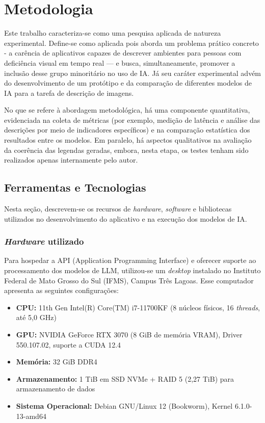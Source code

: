 \chapter{Metodologia}  \label{cap:03}

Este trabalho caracteriza-se como uma pesquisa aplicada de natureza experimental. Define-se como aplicada pois aborda um problema prático concreto - a carência de aplicativos capazes de descrever ambientes para pessoas com deficiência visual em tempo real — e busca, simultaneamente, promover a inclusão desse grupo minoritário no uso de IA. Já seu caráter experimental advém do desenvolvimento de um protótipo e da comparação de diferentes modelos de IA para a tarefa de descrição de imagens.

No que se refere à abordagem metodológica, há uma componente quantitativa, evidenciada na coleta de métricas (por exemplo, medição de latência e análise das descrições por meio de indicadores específicos) e na comparação estatística dos resultados entre os modelos. Em paralelo, há aspectos qualitativos na avaliação da coerência das legendas geradas, embora, nesta etapa, os testes tenham sido realizados apenas internamente pelo autor.

\section{Ferramentas e Tecnologias}

Nesta seção, descrevem-se os recursos de \textit{hardware}, \textit{software} e bibliotecas utilizados no desenvolvimento do aplicativo e na execução dos modelos de IA.

\subsection{\textit{Hardware} utilizado}

Para hospedar a API (Application Programming Interface) e oferecer suporte ao processamento dos modelos de LLM, utilizou-se um \textit{desktop} instalado no Instituto Federal de Mato Grosso do Sul (IFMS), Campus Três Lagoas. Esse computador apresenta as seguintes configurações:

\begin{itemize}
    \item \textbf{CPU:} 11th Gen Intel(R) Core(TM) i7-11700KF (8 núcleos físicos, 16 \textit{threads}, até 5,0 GHz)
    \item \textbf{GPU:} NVIDIA GeForce RTX 3070 (8 GiB de memória VRAM), Driver 550.107.02, suporte a CUDA 12.4
    \item \textbf{Memória:} 32 GiB DDR4
    \item \textbf{Armazenamento:} 1 TiB em SSD NVMe + RAID 5 (2,27 TiB) para armazenamento de dados
    \item \textbf{Sistema Operacional:} Debian GNU/Linux 12 (Bookworm), Kernel 6.1.0-13-amd64
\end{itemize}

